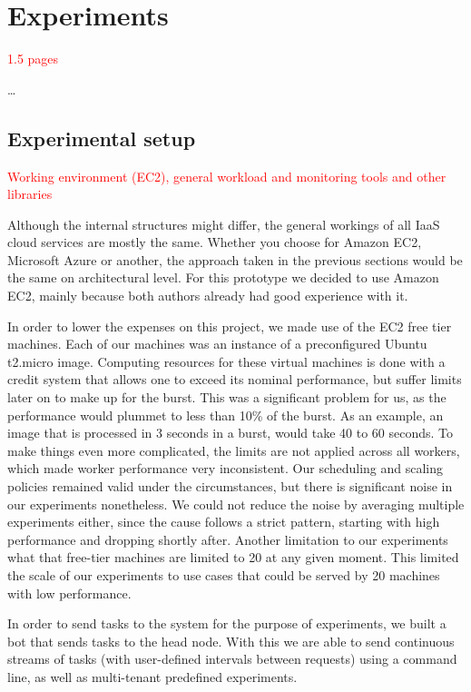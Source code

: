 \documentclass{stylesheet}
\begin{document}
\section{Experiments}
\label{sec:experiments}
\textcolor{red}{1.5 pages}

\ldots

\subsection{Experimental setup}
\label{subsec:setup}
\textcolor{red}{Working environment (EC2), general workload and monitoring tools and other libraries}

Although the internal structures might differ, the general workings of all IaaS cloud services are mostly the same. Whether you choose for Amazon EC2, Microsoft Azure or another, the approach taken in the previous sections would be the same on architectural level. For this prototype we decided to use Amazon EC2, mainly because both authors already had good experience with it.

In order to lower the expenses on this project, we made use of the EC2 free tier machines. Each of our machines was an instance of a preconfigured Ubuntu t2.micro image. Computing resources for these virtual machines is done with a credit system that allows one to exceed its nominal performance, but suffer limits later on to make up for the burst. This was a significant problem for us, as the performance would plummet to less than 10\% of the burst. As an example, an image that is processed in 3 seconds in a burst, would take 40 to 60 seconds. To make things even more complicated, the limits are not applied across all workers, which made worker performance very inconsistent. Our scheduling and scaling policies remained valid under the circumstances, but there is significant noise in our experiments nonetheless. We could not reduce the noise by averaging multiple experiments either, since the cause follows a strict pattern, starting with high performance and dropping shortly after. Another limitation to our experiments what that free-tier machines are limited to 20 at any given moment. This limited the scale of our experiments to use cases that could be served by 20 machines with low performance.

In order to send tasks to the system for the purpose of experiments, we built a bot that sends tasks to the head node. With this we are able to send continuous streams of tasks (with user-defined intervals between requests) using a command line, as well as multi-tenant predefined experiments. 
\end{document}
